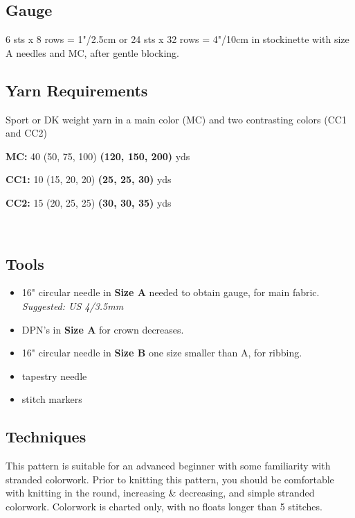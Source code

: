 \documentclass[12pt]{article}
\begin{document}
\begin{multicols}{2}
\subsection*{Gauge}

6 sts x 8 rows = 1"/2.5cm or 24 sts x 32 rows = 4"/10cm in stockinette with size A needles and MC, after gentle blocking.

\subsection*{Yarn Requirements}

Sport or DK weight yarn in a main color (MC) and two contrasting colors (CC1 and CC2)

\textbf{MC:} 40 (50, 75, 100) \textbf{(120, 150, 200)} yds

\textbf{CC1:} 10 (15, 20, 20) \textbf{(25, 25, 30)} yds

\textbf{CC2:} 15 (20, 25, 25) \textbf{(30, 30, 35)} yds


\vfill
~\\
\columnbreak

\subsection*{Tools}

\begin{itemize} %
\item 16" circular needle in \textbf{Size A} needed to obtain gauge, for main fabric. \emph{Suggested: US 4/3.5mm} 
\item DPN's in \textbf{Size A} for crown decreases.
\item 16" circular needle in \textbf{Size B} one size smaller than A, for ribbing.
\item tapestry needle
\item stitch markers %
\end{itemize}

\subsection*{Techniques}

This pattern is suitable for an advanced beginner with some familiarity with stranded colorwork.
Prior to knitting this pattern, you should be comfortable with knitting in the round, increasing \& decreasing, and simple stranded colorwork. Colorwork is charted only, with no floats longer than 5 stitches. 


\end{multicols}
\end{document}
